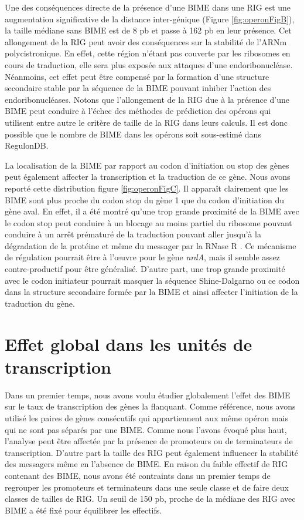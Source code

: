 \documentclass[12pt,a4paper]{report}
\begin{document}
\begin{onehalfspace}
Une des conséquences directe de la présence d'une BIME dans une RIG est une augmentation significative de la distance inter-génique (Figure \autoref{fig:operonFigB}), la taille médiane sans BIME est de 8 pb et passe à 162 pb en leur présence. Cet allongement de la RIG peut avoir des conséquences sur la stabilité de l'ARNm polycistronique. En effet, cette région n'étant pas couverte par les ribosomes en cours de traduction, elle sera plus exposée aux attaques d'une endoribonucléase. Néanmoins, cet effet peut être compensé par la formation d'une structure secondaire stable par la séquence de la BIME pouvant inhiber l'action des endoribonucléases. Notons que l'allongement de la RIG due à la présence d'une BIME peut conduire à l'échec des méthodes de prédiction des opérons qui utilisent entre autre le critère de taille de la RIG dans leurs calculs. Il est donc possible que le nombre de BIME dans les opérons soit sous-estimé dans RegulonDB.

La localisation de la BIME par rapport au codon d’initiation ou stop des gènes peut également affecter la transcription et la traduction de ce gène.  Nous avons reporté cette distribution figure \autoref{fig:operonFigC}. Il apparaît clairement que les BIME sont plus proche du codon stop du gène 1 que du codon d’initiation du gène aval. En effet, il a été montré qu’une trop grande proximité de la BIME avec le codon stop peut conduire à un blocage au moins partiel du ribosome pouvant conduire à un arrêt prématuré de la traduction pouvant aller jusqu’à la dégradation de la protéine et même du messager par la RNase R \citep{Liang2015}. Ce mécanisme de régulation pourrait être à l’œuvre pour le gène \textit{nrdA}, mais il semble assez contre-productif pour être généralisé. D’autre part, une trop grande proximité avec le codon initiateur pourrait masquer la séquence Shine-Dalgarno ou ce codon dans la structure secondaire formée par la BIME et ainsi affecter l’initiation de la traduction du gène.

\section*{Effet global dans les unités de transcription}

Dans un premier temps, nous avons voulu étudier globalement l'effet des BIME sur le taux de transcription des gènes la flanquant. Comme référence, nous avons utilisé les paires de gènes consécutifs qui appartiennent aux même opéron mais qui ne sont pas séparés par une BIME. Comme nous l'avons évoqué plus haut, l'analyse peut être affectée par la présence de promoteurs ou de terminateurs de transcription. D'autre part la taille des RIG peut également influencer la stabilité des messagers même en l'absence de BIME. En raison du faible effectif de RIG contenant des BIME, nous avons été contraints dans un premier temps de regrouper les promoteurs et terminateurs dans une seule classe et de faire deux classes de tailles de RIG. Un seuil de 150 pb, proche de la médiane des RIG avec BIME a été fixé pour équilibrer les effectifs.


\end{onehalfspace}
\end{document}
